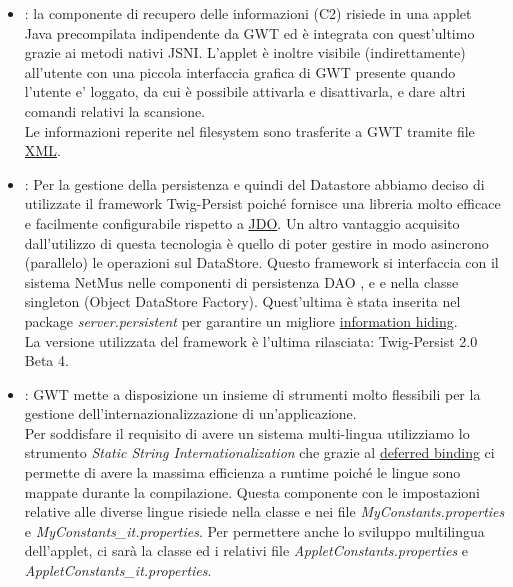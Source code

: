 \begin{itemize}
  \item {} : la componente di recupero delle informazioni (C2) risiede
  in una applet\\Java precompilata indipendente da GWT ed \`e integrata con
  quest'ultimo grazie ai metodi nativi JSNI. L'applet \`e inoltre visibile
  (indirettamente) all'utente con una piccola interfaccia grafica di GWT
  presente quando l'utente e' loggato, da cui \`e possibile
  attivarla e disattivarla, e dare altri comandi relativi la scansione.\\ Le
  informazioni reperite nel filesystem sono trasferite a GWT tramite file
  \underline{XML}.
  
  \item {} : Per la gestione della persistenza e
  quindi del Datastore abbiamo deciso di utilizzate il framework Twig-Persist poich\'e
  fornisce una libreria molto efficace e facilmente configurabile
  rispetto a \underline{JDO}. Un altro vantaggio acquisito dall'utilizzo di
  questa tecnologia \`e quello di poter gestire in modo asincrono (parallelo) le
  operazioni sul DataStore. Questo framework si interfaccia con il sistema
  NetMus nelle componenti di persistenza DAO ,  e
   e nella classe singleton  (Object DataStore
  Factory). Quest'ultima \`e stata inserita nel package \emph{server.persistent}
  per garantire un migliore \underline{information hiding}. \\
  La versione utilizzata del framework \`e l'ultima rilasciata: Twig-Persist 2.0
  Beta 4.
  
  \item {} : GWT mette a disposizione un insieme di
  strumenti molto flessibili per la gestione dell'internazionalizzazione di
  un'applicazione.\\ Per soddisfare il requisito di avere un sistema
  multi-lingua utilizziamo lo strumento \emph{Static String
  Internationalization} che grazie al \underline{deferred binding} ci permette
  di avere la massima efficienza a runtime poich\'e le lingue sono mappate durante la
  compilazione. Questa componente con le impostazioni relative alle
  diverse lingue risiede nella classe  e nei file
  \emph{MyConstants.properties} e \emph{MyConstants\_it.properties}. Per
  permettere anche lo sviluppo multilingua dell'applet, ci sar\`a la classe
   ed i relativi file \emph{AppletConstants.properties} e
  \emph{AppletConstants\_it.properties}.
  

\end{itemize}
